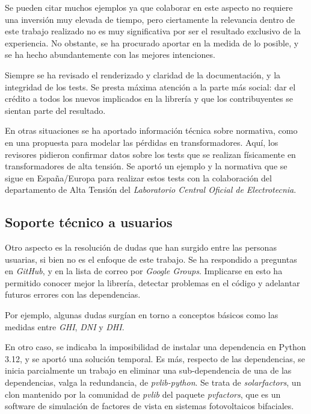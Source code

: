 Se pueden citar muchos ejemplos ya que colaborar en este aspecto no requiere una inversión muy elevada de tiempo, pero ciertamente la relevancia dentro de este trabajo realizado no es muy significativa por ser el resultado exclusivo de la experiencia. No obstante, se ha procurado aportar en la medida de lo posible, y se ha hecho abundantemente con las mejores intenciones.

Siempre se ha revisado el renderizado y claridad de la documentación, y la integridad de los tests. Se presta máxima atención a la parte más social: dar el crédito a todos los nuevos implicados en la librería y que los contribuyentes se sientan parte del resultado.

En otras situaciones se ha aportado información técnica sobre normativa, como en una propuesta para modelar las pérdidas en transformadores. Aquí, los revisores pidieron confirmar datos sobre los tests que se realizan físicamente en transformadores de alta tensión. Se aportó un ejemplo y la normativa que se sigue en España/Europa para realizar estos tests con la colaboración del departamento de Alta Tensión del \textit{Laboratorio Central Oficial de Electrotecnia}.

\subsection{Soporte técnico a usuarios} \label{sct:desarrollo:soporte_tecnico}

Otro aspecto es la resolución de dudas que han surgido entre las personas usuarias, si bien no es el enfoque de este trabajo. Se ha respondido a preguntas en \textit{GitHub}, y en la lista de correo por \textit{Google Groups}. Implicarse en esto ha permitido conocer mejor la librería, detectar problemas en el código y adelantar futuros errores con las dependencias.

Por ejemplo, algunas dudas surgían en torno a conceptos básicos como las medidas entre \textit{GHI}, \textit{DNI} y \textit{DHI}.

En otro caso, se indicaba la imposibilidad de instalar una dependencia en Python 3.12, y se aportó una solución temporal. Es más, respecto de las dependencias, se inicia parcialmente un trabajo en eliminar una sub-dependencia de una de las dependencias, valga la redundancia, de \textit{pvlib-python}. Se trata de \textit{solarfactors}, un clon mantenido por la comunidad de \textit{pvlib} del paquete \textit{pvfactors}, que es un software de simulación de factores de vista en sistemas fotovoltaicos bifaciales.

